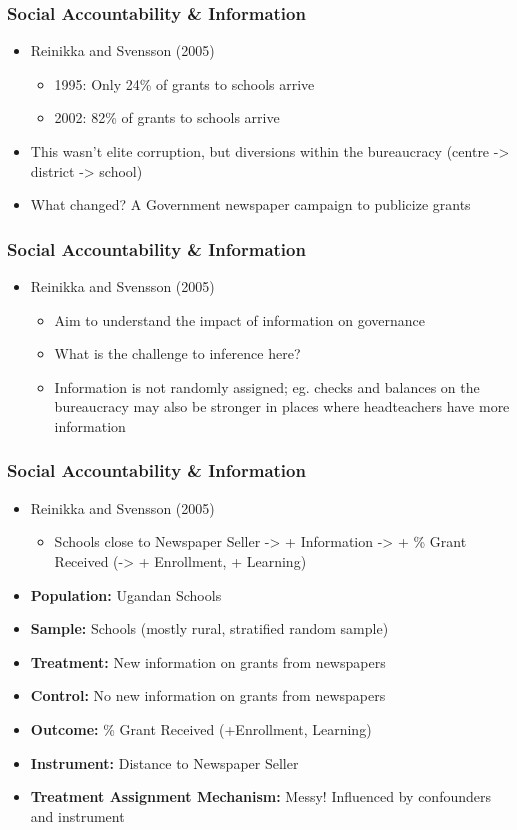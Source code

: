 \documentclass[xcolor=x11names,compress]{beamer}\usepackage[]{graphicx}\usepackage[]{color}
\renewcommand{\(}{\begin{columns}}
\renewcommand{\)}{\end{columns}}
\newcommand{\<}[1]{\begin{column}{#1}}
\renewcommand{\>}{\end{column}}
\begin{document}
\begin{frame}
\frametitle{Social Accountability \& Information}
\begin{itemize}
\item Reinikka and Svensson (2005)
\begin{itemize}
\item 1995: Only 24\% of grants to schools arrive
\item 2002: 82\% of grants to schools arrive
\pause
\end{itemize}
\item This wasn't elite corruption, but diversions within the bureaucracy (centre -> district -> school)
\item What changed? A Government newspaper campaign to publicize grants
\end{itemize}
\end{frame}

\begin{frame}
\frametitle{Social Accountability \& Information}
\begin{itemize}
\item Reinikka and Svensson (2005)
\begin{itemize}
\item Aim to understand the impact of information on governance
\pause
\item What is the challenge to inference here? 
\pause
\item Information is not randomly assigned; eg. checks and balances on the bureaucracy may also be stronger in places where headteachers have more information
\end{itemize}
\end{itemize}
\end{frame}

\begin{frame}
\frametitle{Social Accountability \& Information}
\begin{itemize}
\item Reinikka and Svensson (2005)
\begin{itemize}
\item Schools close to Newspaper Seller -> + Information -> + \% Grant Received (-> + Enrollment, + Learning)
\pause
\end{itemize}
\item \textbf{Population:} \pause Ugandan Schools
\pause
\item \textbf{Sample:}  Schools (mostly rural, stratified random sample)
\pause
\item \textbf{Treatment:} \pause New information on grants from newspapers

\item \textbf{Control:} \pause No new information on grants from newspapers
\pause
\item \textbf{Outcome:} \pause \% Grant Received (+Enrollment, Learning)
\pause
\item \textbf{Instrument:} \pause Distance to Newspaper Seller
\pause
\item \textbf{Treatment Assignment Mechanism:} \pause Messy! Influenced by confounders and instrument
\end{itemize}
\end{frame}
\end{document}
